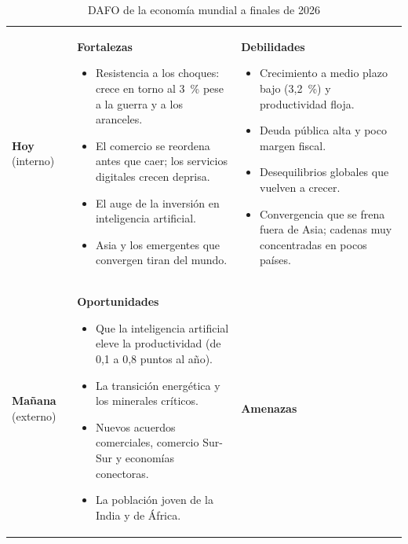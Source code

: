 \documentclass[11pt]{article}
\begin{document}
\begin{table}[H]
\centering
\caption{DAFO de la economía mundial a finales de 2026}\label{tab:dafo}
\small
\begin{tabular}{>{\raggedright\arraybackslash}m{1.5cm}>{\raggedright\arraybackslash}m{6.45cm}>{\raggedright\arraybackslash}m{6.45cm}}
\toprule
 & \multicolumn{1}{c}{\textcolor{tceeverde}{\textbf{A favor}}} & \multicolumn{1}{c}{\textcolor{tceerojo}{\textbf{En contra}}} \\
\midrule
\textbf{Hoy} \newline (interno) & \cellcolor{tceesalvia}\textcolor{tceeverde}{\textbf{Fortalezas}}
\begin{itemize}
\item Resistencia a los choques: crece en torno al 3~\% pese a la guerra y a los aranceles.
\item El comercio se reordena antes que caer; los servicios digitales crecen deprisa.
\item El auge de la inversión en inteligencia artificial.
\item Asia y los emergentes que convergen tiran del mundo.
\end{itemize}
& \cellcolor{tceesalmon}\textcolor{tceerojo}{\textbf{Debilidades}}
\begin{itemize}
\item Crecimiento a medio plazo bajo (3,2~\%) y productividad floja\nocite{FMI2026WEO}.
\item Deuda pública alta y poco margen fiscal.
\item Desequilibrios globales que vuelven a crecer.
\item Convergencia que se frena fuera de Asia; cadenas muy concentradas en pocos países.
\end{itemize}\\
\addlinespace[0.3em]
\textbf{Mañana} \newline (externo) & \cellcolor{tceeazulpalido}\textcolor{tceeazul}{\textbf{Oportunidades}}
\begin{itemize}
\item Que la inteligencia artificial eleve la productividad (de 0,1 a 0,8 puntos al año).
\item La transición energética y los minerales críticos.
\item Nuevos acuerdos comerciales, comercio Sur-Sur y economías conectoras.
\item La población joven de la India y de África.
\end{itemize}
& \cellcolor{tceegrisclaro}\textcolor{tceedorado}{\textbf{Amenazas}}

\end{tabular}
\end{table}
\end{document}
